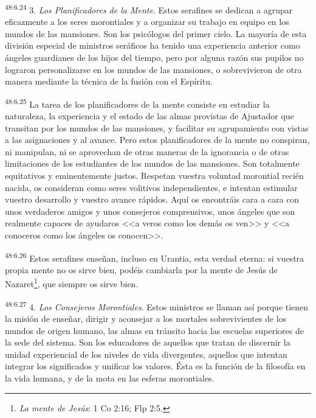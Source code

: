 \par
\textsuperscript{48:6.24} 3. \textit{Los Planificadores de la Mente}. Estos serafines se dedican a agrupar eficazmente a los seres morontiales y a organizar su trabajo en equipo en los mundos de las mansiones. Son los psicólogos del primer cielo. La mayoría de esta división especial de ministros seráficos ha tenido una experiencia anterior como ángeles guardianes de los hijos del tiempo, pero por alguna razón sus pupilos no lograron personalizarse en los mundos de las mansiones, o sobrevivieron de otra manera mediante la técnica de la fusión con el Espíritu.

\par
\textsuperscript{48:6.25} La tarea de los planificadores de la mente consiste en estudiar la naturaleza, la experiencia y el estado de las almas provistas de Ajustador que transitan por los mundos de las mansiones, y facilitar su agrupamiento con vistas a las asignaciones y al avance. Pero estos planificadores de la mente no conspiran, ni manipulan, ni se aprovechan de otras maneras de la ignorancia o de otras limitaciones de los estudiantes de los mundos de las mansiones. Son totalmente equitativos y eminentemente justos. Respetan vuestra voluntad morontial recién nacida, os consideran como seres volitivos independientes, e intentan estimular vuestro desarrollo y vuestro avance rápidos. Aquí os encontráis cara a cara con unos verdaderos amigos y unos consejeros comprensivos, unos ángeles que son realmente capaces de ayudaros <<a veros como los demás os ven>> y <<a conoceros como los ángeles os conocen>>.

\par
\textsuperscript{48:6.26} Estos serafines enseñan, incluso en Urantia, esta verdad eterna: si vuestra propia mente no os sirve bien, podéis cambiarla por la mente de Jesús de Nazaret\footnote{\textit{La mente de Jesús}: 1 Co 2:16; Flp 2:5.}, que siempre os sirve bien.

\par
\textsuperscript{48:6.27} 4. \textit{Los Consejeros Morontiales}. Estos ministros se llaman así porque tienen la misión de enseñar, dirigir y aconsejar a los mortales sobrevivientes de los mundos de origen humano, las almas en tránsito hacia las escuelas superiores de la sede del sistema. Son los educadores de aquellos que tratan de discernir la unidad experiencial de los niveles de vida divergentes, aquellos que intentan integrar los significados y unificar los valores. Ésta es la función de la filosofía en la vida humana, y de la mota en las esferas morontiales.


